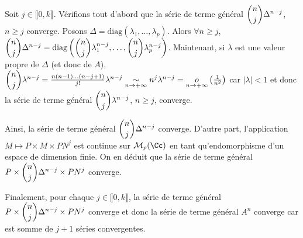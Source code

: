 {{Soit $j\in\llbracket0,k\rrbracket$. Vérifions tout d'abord que la série de terme général $\dbinom{n}{j}\Delta^{n-j}$, $n\geqslant j$ converge. Posons $\Delta=\text{diag}(\lambda_1,\ldots,\lambda_p)$. Alors $\forall n\geqslant j$, $\dbinom{n}{j}\Delta^{n-j}=\text{diag}\left(\dbinom{n}{j}\lambda_1^{n-j},\ldots,\dbinom{n}{j}\lambda_p^{n-j}\right)$. Maintenant, si $\lambda$ est une valeur propre de $\Delta$ (et donc de $A$), $\dbinom{n}{j}\lambda^{n-j}= \frac{n(n-1)\ldots(n-j+1)}{j!}\lambda^{n-j}\underset{n\rightarrow+\infty}{\sim}n^j\lambda^{n-j}=\underset{n\rightarrow+\infty}o\left( \frac{1}{n^2}\right)$ car $|\lambda|<1$ et donc la série de terme général $\dbinom{n}{j}\lambda^{n-j}$, $n\geqslant j$, converge.

Ainsi, la série de terme général $\dbinom{n}{j}\Delta^{n-j}$ converge. D'autre part, l'application $M\mapsto P\times M\times PN^j$ est continue sur $\mathcal{M}_p(\Cc)$ en tant qu'endomorphisme d'un espace de dimension finie. On en déduit que la série de terme général $P\times\dbinom{n}{j}\Delta^{n-j}\times PN^j$ converge.

Finalement, pour chaque $j\in\llbracket0,k\rrbracket$, la série de terme général $P\times\dbinom{n}{j}\Delta^{n-j}\times PN^j$ converge et donc la série de terme général $A^n$ converge car est somme de $j+1$ séries convergentes.}
}